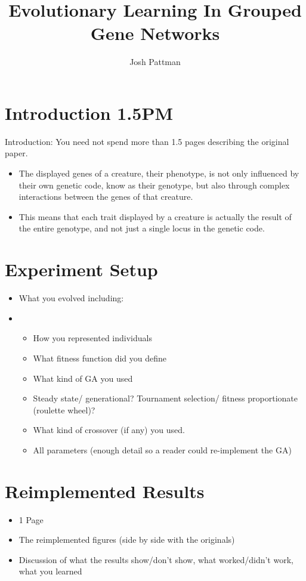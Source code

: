 \documentclass[twocolumn,a4paper]{article}
\author{Josh Pattman}
\title{Evolutionary Learning In Grouped Gene Networks}
\begin{document}
	\maketitle
    \section{Introduction 1.5PM}
    Introduction: You need not spend more than 1.5 pages describing the original paper.
    \begin{itemize}
        \item The displayed genes of a creature, their phenotype, is not only influenced by their own genetic code, know as their genotype, but also through complex interactions between the genes of that creature.
        \item This means that each trait displayed by a creature is actually the result of the entire genotype, and not just a single locus in the genetic code.
    \end{itemize}

    \section{Experiment Setup}
    \begin{itemize}
        \item What you evolved including:
        \item \begin{itemize}
            \item How you represented individuals
            \item What fitness function did you define
            \item What kind of GA you used
            \item Steady state/ generational?  Tournament selection/ fitness proportionate (roulette wheel)?
            \item What kind of crossover (if any) you used.
            \item All parameters (enough detail so a reader could re-implement the GA)
        \end{itemize}
    \end{itemize}

    \section{Reimplemented Results}
    \begin{itemize}
        \item 1 Page
        \item The reimplemented figures (side by side with the originals)
        \item Discussion of what the results show/don't show, what worked/didn't work, what you learned
    \end{itemize}
\end{document}
